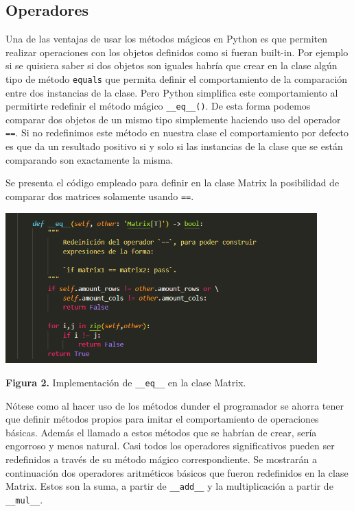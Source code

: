 \documentclass[10pt]{article} %
\newcommand{\csl}[1]{\colorbox{backcolour}{\texttt{#1}}}
\newcommand{\imgcaption}[2]{\tiny \textbf{Figura #1.} #2.}
\newcommand{\mgc}[2][]{\colorbox{backcolour}{\texttt{\_\_#2\_\_#1}}}
\newcommand{\mgccapt}[1]{\texttt{\_\_#1\_\_}}
\begin{document}
\subsection{Operadores}

Una de las ventajas de usar los m\'etodos  m\'agicos en Python es que permiten realizar operaciones con los objetos definidos como si fueran built-in. Por ejemplo si se quisiera saber si dos objetos son iguales habr\'ia que crear en la clase alg\'un tipo de m\'etodo \csl{equals} que permita definir el comportamiento de la comparaci\'on entre dos instancias de la clase. Pero Python simplifica este comportamiento al permitirte redefinir el m\'etodo m\'agico \mgc[()]{eq}. De esta forma podemos comparar dos objetos de un mismo tipo simplemente haciendo uso del operador \csl{==}. Si no redefinimos este m\'etodo en nuestra clase el comportamiento por defecto es que da un resultado positivo si y solo si las instancias de la clase que se est\'an comparando son exactamente la misma.

Se presenta el c\'odigo empleado para definir en la clase Matrix la posibilidad de comparar dos matrices solamente usando \csl{==}.

\begin{center}
	\includegraphics[width=12cm]{eq.png} 
	
	\imgcaption{2}{Implementaci\'on de \mgccapt{eq} en la clase Matrix}
\end{center}


N\'otese como al hacer uso de los m\'etodos dunder el programador se ahorra tener que definir m\'etodos propios para imitar el comportamiento de operaciones b\'asicas. Adem\'as el llamado a estos m\'etodos que se habr\'ian de crear, ser\'ia engorroso y menos natural. Casi todos los operadores significativos pueden ser redefinidos a trav\'es de su m\'etodo m\'agico correspondiente. Se mostrar\'an a continuaci\'on dos operadores aritm\'eticos b\'asicos que fueron redefinidos en la clase Matrix. Estos son la suma, a partir de \mgc{add} y la multiplicaci\'on a partir de \mgc{mul}.
\end{document}
